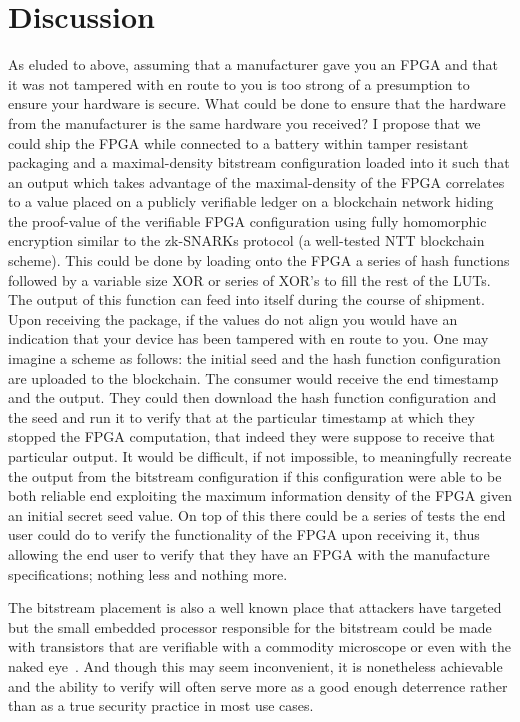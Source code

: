 \documentclass[conference]{IEEEtran}
\begin{document}
	\section{Discussion}
	As eluded to above, assuming that a manufacturer gave you an FPGA and that it was not tampered with en route to you is too strong of a presumption to ensure your hardware is secure. What could be done to ensure that the hardware from the manufacturer is the same hardware you received? I propose that we could ship the FPGA while connected to a battery within tamper resistant packaging and a maximal-density bitstream configuration loaded into it such that an output which takes advantage of the maximal-density of the FPGA correlates to a value placed on a publicly verifiable ledger on a blockchain network hiding the proof-value of the verifiable FPGA configuration using fully homomorphic encryption similar to the zk-SNARKs protocol (a well-tested NTT blockchain scheme). This could be done by loading onto the FPGA a series of hash functions followed by a variable size XOR or series of XOR's to fill the rest of the LUTs. The output of this function can feed into itself during the course of shipment. Upon receiving the package, if the values do not align you would have an indication that your device has been tampered with en route to you. One may imagine a scheme as follows: the initial seed and the hash function configuration are uploaded to the blockchain. The consumer would receive the end timestamp and the output. They could then download the hash function configuration and the seed and run it to verify that at the particular timestamp at which they stopped the FPGA computation, that indeed they were suppose to receive that particular output.  It would be difficult, if not impossible, to meaningfully recreate the output from the bitstream configuration if this configuration were able to be both reliable end exploiting the maximum information density of the FPGA given an initial secret seed value. On top of this there could be a series of tests the end user could do to verify the functionality of the FPGA upon receiving it, thus allowing the end user to verify that they have an FPGA with the manufacture specifications; nothing less and nothing more.
	
	The bitstream placement is also a well known place that attackers have targeted~\cite{swierczynski} but the small embedded processor responsible for the bitstream could be made with transistors that are verifiable with a commodity microscope or even with the naked eye~\cite{monster}. And though this may seem inconvenient, it is nonetheless achievable and the ability to verify will often serve more as a good enough deterrence rather than as a true security practice in most use cases.
	
\end{document}
